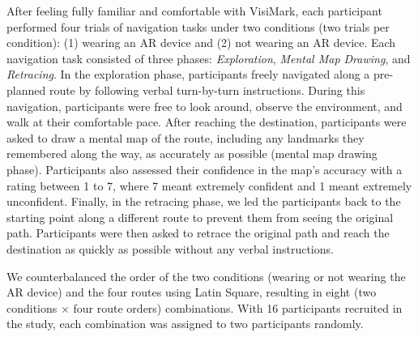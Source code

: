 
After feeling fully familiar and comfortable with VisiMark, each participant performed four trials of navigation tasks under two conditions (two trials per condition): (1) wearing an AR device and (2) not wearing an AR device. Each navigation task consisted of three phases: \textit{Exploration}, \textit{Mental Map Drawing}, and \textit{Retracing}. In the exploration phase, participants freely navigated along a pre-planned route by following verbal turn-by-turn instructions.  During this navigation, participants were free to look around, observe the environment, and walk at their comfortable pace. After reaching the destination, participants were asked to draw a mental map of the route, including any landmarks they remembered along the way, as accurately as possible (mental map drawing phase). Participants also assessed their confidence in the map's accuracy with a rating between 1 to 7, where 7 meant extremely confident and 1 meant extremely unconfident. Finally, in the retracing phase, we led the participants back to the starting point along a different route to prevent them from seeing the original path. Participants were then asked to retrace the original path and reach the destination as quickly as possible without any verbal instructions.




We counterbalanced the order of the two conditions (wearing or not wearing the AR device) and the four routes using Latin Square, resulting in eight (two conditions $\times$ four route orders) combinations. With 16 participants recruited in the study, each combination was assigned to two participants randomly.%

